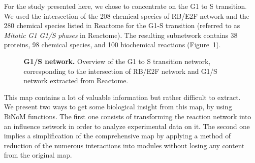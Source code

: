 \documentclass[10pt]{bmc_article}
\newenvironment{bmcformat}{\baselineskip20pt\sloppy\setboolean{publ}{false}}{\baselineskip20pt\sloppy}
\begin{document}
\begin{bmcformat}
For the study presented here, we chose to concentrate on the G1 to S transition. We
used the intersection of the 208 chemical species
of RB/E2F network and the 280 chemical species listed in Reactome \cite{joshi2005reactome} for the G1-S transition
(referred to as \emph{Mitotic G1 G1/S phases} in Reactome). The resulting
subnetwork contains 38 proteins, 98 chemical species, and 100 biochemical
reactions (Figure~\ref{g1s}).

\begin{figure}[h]
 \caption{\label{g1s}  \textbf{G1/S network.}
	Overview of the G1 to S transition network, corresponding to the intersection of
RB/E2F network and G1/S network extracted from Reactome.}
\end{figure}

This map contains a lot of valuable information but rather difficult to extract. We present two
ways to get some biological insight from this map, by using BiNoM functions. The first one consists of
transforming the reaction network into an influence network in order to analyze
experimental data on it. The second one implies a simplification of the comprehensive map by
applying a method of reduction of the numerous interactions into modules without
losing any content from the original map.


\end{bmcformat}
\end{document}
